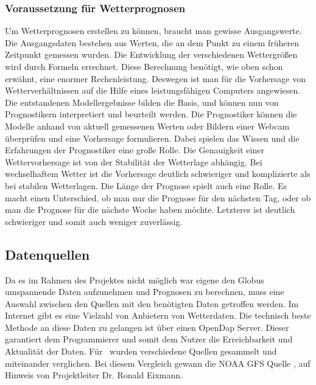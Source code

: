 \subsubsection{Voraussetzung für Wetterprognosen} %
Um Wetterprognosen erstellen zu können, braucht man gewisse Ausgangswerte.
Die Ausgangsdaten bestehen aus Werten,
die an dem Punkt zu einem früheren Zeitpunkt gemessen wurden.
Die Entwicklung der verschiedenen Wettergrößen wird durch Formeln errechnet.
Diese Berechnung benötigt, wie oben schon erwähnt, eine enormer Rechenleistung.
Deswegen ist man für die Vorhersage von Wetterverhältnissen auf
die Hilfe eines leistungsfähigen Computers angewiesen.
Die entstandenen Modellergebnisse bilden die Basis, und können nun
von Prognostikern interpretiert und beurteilt werden.
Die Prognostiker können die Modelle anhand von aktuell gemessenen Werten
oder Bildern einer Webcam überprüfen und eine Vorhersage formulieren.
Dabei spielen das Wissen und die Erfahrungen der Prognostiker eine große Rolle.
Die Genauigkeit einer Wettervorhersage ist von der Stabilität der Wetterlage abhängig.
Bei wechselhaftem Wetter ist die Vorhersage deutlich schwieriger
und komplizierte als bei stabilen Wetterlagen.
Die Länge der Prognose spielt auch eine Rolle.
Es macht einen Unterschied,
ob man nur die Prognose für den nächsten Tag,
oder ob man die Prognose für die nächste Woche haben möchte.
Letzteres ist deutlich schwieriger und somit auch weniger zuverlässig.

\subsection{Datenquellen} %
Da es im Rahmen des Projektes nicht möglich war
eigene den Globus umspannende Daten aufzunehmen und Prognosen zu berechnen,
muss eine Auswahl zwischen den Quellen mit den benötigten Daten getroffen werden.
Im Internet gibt es eine Vielzahl von Anbietern von Wetterdaten.
Die technisch beste Methode an diese Daten zu gelangen ist über einen OpenDap Server.
Dieser garantiert dem Programmierer und somit dem Nutzer
die Erreichbarkeit und Aktualität der Daten.
Für \vs\ wurden verschiedene Quellen gesammelt und miteinander verglichen.
Bei diesem Vergleich
gewann die NOAA GFS Quelle \cite{noaa} , auf Hinweis von Projektleiter Dr. Ronald Eixmann.

